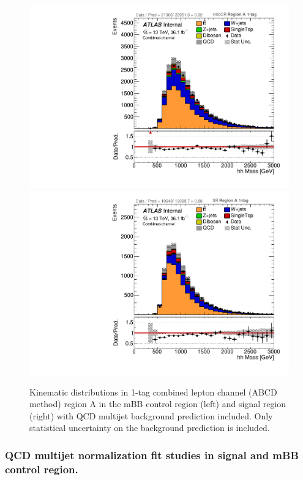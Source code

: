 \begin{figure}[!htbp]
\begin{center}
\includegraphics[scale=0.33]{./figures/boosted/ABCD_1tag0bjet/lepCombined_mbbcr_RegionA_hhMass_withDD}   
\includegraphics[scale=0.33]{./figures/boosted/ABCD_1tag0bjet/lepCombined_SR_RegionA_hhMass_withDD}      
\caption{Kinematic distributions in 1-tag combined lepton channel (ABCD method) region A in the mBB control region (left) and signal region (right)
with QCD multijet background prediction included. Only statistical uncertainty on the background prediction is included.}
\label{fig:boosted_abcd_1tag0bjet_region_a_withqcd_lepton}
\end{center}
\end{figure}


\FloatBarrier
\subsubsection{QCD multijet normalization fit studies in signal and mBB control region.}
\label{app:boosted_qcd_float_1tag_SRmbbcr_fit}

